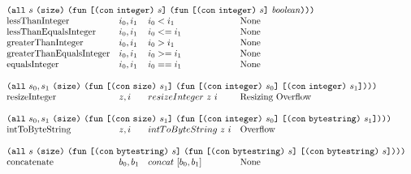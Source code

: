 \documentclass[../main.tex]{subfiles}
\begin{document}
\begin{figure*}[t]
\[\begin{array}{llll}
        \multicolumn{4}{l}{
          \allT{s}{\sizeK{}}{
            \funT{\appT{\conT{\conIntegerType{}}}{s}}
                 {\funT{\appT{\conT{\conIntegerType{}}}{s}}
                       {\mathit{boolean}}}}}\\
        \mathrm{lessThanInteger}            &  i_0 , i_1   &   i_0 < i_1    &   \textrm{None}         \\
        \mathrm{lessThanEqualsInteger}      &  i_0 , i_1   &   i_0 <= i_1   &   \textrm{None}         \\
        \mathrm{greaterThanInteger}         &  i_0 , i_1   &   i_0 > i_1    &   \textrm{None}         \\
        \mathrm{greaterThanEqualsInteger}   &  i_0 , i_1   &   i_0 >= i_1   &   \textrm{None}         \\
        \mathrm{equalsInteger}              &  i_0 , i_1   &   i_0 == i_1   &   \textrm{None}         \\
        &&\\
        
        \multicolumn{4}{l}{
          \allT{s_0,s_1}{\sizeK{}}{
            \funT{\appT{\conT{\conSizeType{}}}{s_1}}
                 {\funT{\appT{\conT{\conIntegerType{}}}{s_0}}
                       {\appT{\conT{\conIntegerType{}}}{s_1}}}}} \\
        \mathrm{resizeInteger}   &   z, i   &   resizeInteger ~ z ~ i   &   \textrm{Resizing Overflow} \\
        &&\\
        
        \multicolumn{4}{l}{
          \allT{s_0,s_1}{\sizeK{}}{
            \funT{\appT{\conT{\conSizeType{}}}{s_1}}
                 {\funT{\appT{\conT{\conIntegerType{}}}{s_0}}
                       {\appT{\conT{\conBytestringType{}}}{s_1}}}}}\\
        \mathrm{intToByteString}            &  z, i           &   intToByteString ~ z ~ i   &   \textrm{Overflow} \\
        &&\\
        
        
        \multicolumn{4}{l}{
          \allT{s}{\sizeK{}}{
            \funT{\appT{\conT{\conBytestringType{}}}{s}}
                 {\funT{\appT{\conT{\conBytestringType{}}}{s}}
                       {\appT{\conT{\conBytestringType{}}}{s}}}}}\\
        \mathrm{concatenate}       &   b_0 , b_1   & concat ~ [b_0,b_1]   &   \textrm{None}         \\
        &&\\
        

\end{array}\]
\end{figure*}
\end{document}
